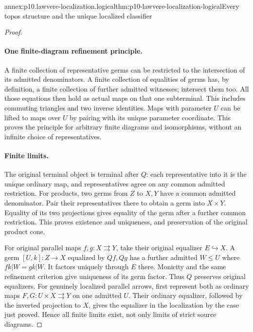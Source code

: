 \begin{annexitem}{annex:p10.lawvere-localization.logical}{thm:p10-lawvere-localization-logical}{Every topos structure and the unique localized classifier}
\begin{proof}
\paragraph{One finite-diagram refinement principle.}
A finite collection of representative germs can
be restricted to the intersection of its admitted
denominators.  A finite collection of equalities
of germs has, by definition, a finite collection
of further admitted witnesses; intersect them
too.  All those equations then hold as actual
maps on that one subterminal.  This includes
commuting triangles and two inverse identities.
Maps with parameter \(U\) can be lifted to
maps over \(U\) by pairing with its unique
parameter coordinate.  This proves the principle
for arbitrary finite diagrams and isomorphisms,
without an infinite choice of representatives.

\paragraph{Finite limits.}
The original terminal object is terminal after
\(Q\): each representative into it is the
unique ordinary map, and representatives agree
on any common admitted restriction.  For products,
two germs from \(Z\) to \(X,Y\) have a common
admitted denominator.  Pair their representatives
there to obtain a germ into \(X\times Y\).
Equality of its two projections gives equality
of the germ after a further common restriction.
This proves existence and uniqueness, and
preservation of the original product cone.

For original parallel maps \(f,g:X\rightrightarrows Y\),
take their original equalizer \(E\hookrightarrow X\).
A germ \([U,k]:Z\to X\) equalized by \(Qf,Qg\)
has a further admitted \(W\leq U\) where
\(fk|W=gk|W\).  It factors uniquely through
\(E\) there.  Monicity and the same refinement
criterion give uniqueness of its germ factor.
Thus \(Q\) preserves original equalizers.
For genuinely localized parallel arrows, first
represent both as ordinary maps
\(F,G:U\times X\rightrightarrows Y\) on one
admitted \(U\).  Their ordinary equalizer,
followed by the inverted projection to \(X\),
gives the equalizer in the localization by the
case just proved.  Hence all finite limits
exist, not only limits of strict source diagrams.


\end{proof}
\end{annexitem}
